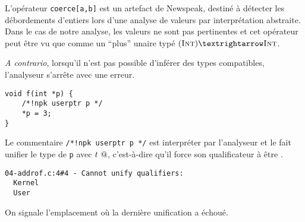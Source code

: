 L'opérateur \texttt{coerce[a,b]} est un artefact de Newspeak, destiné à détecter
les débordements d'entiers lors d'une analyse de valeurs par interprétation
abstraite. Dans le cas de notre analyse, les valeurs ne sont pas pertinentes et
cet opérateur peut être vu que comme un ``plus'' unaire typé $(\tInt) → \tInt$.

\emph{A contrario}, lorsqu'il n'est pas possible d'inférer des types
compatibles, l'analyseur s'arrête avec une erreur.

\begin{verbatim}
void f(int *p) {
    /*!npk userptr p */
    *p = 3;
}
\end{verbatim}

Le commentaire \texttt{/*!npk userptr p */} est interpréter par l'analyseur et
le fait unifier le type de \texttt{p} avec $t~@$, c'est-à-dire qu'il force
son qualificateur à être \qUser.

\begin{verbatim}
04-addrof.c:4#4 - Cannot unify qualifiers:
  Kernel
  User
\end{verbatim}

On signale l'emplacement où la dernière unification a échoué.

